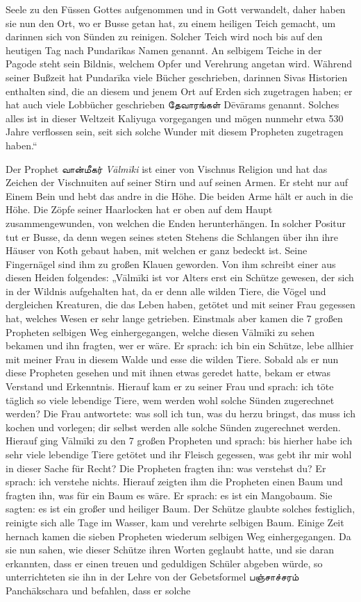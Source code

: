 \documentclass{article}
\newcommand{\TamilText}[1]{\texttamil{#1}}
\newcommand{\tam}[1]{\TamilText{#1}}
\begin{document}
Seele zu den Füssen Gottes aufgenommen und in Gott verwandelt, daher haben sie nun den Ort, wo er Busse getan hat, zu einem heiligen Teich gemacht, um darinnen sich von Sünden zu reinigen. Solcher Teich wird noch bis auf den heutigen Tag nach Pundar\={i}kas Namen genannt. An selbigem Teiche in der Pagode steht sein Bildnis, welchem Opfer und Verehrung angetan wird. Während seiner Bußzeit hat Pundar\={i}ka viele Bücher geschrieben, darinnen Sivas Historien enthalten sind, die an diesem und jenem Ort auf Erden sich zugetragen haben; er hat auch viele Lobbücher geschrieben \tam{தேவாரங்கள்} D\={e}v\={a}rams genannt. Solches alles ist in dieser Weltzeit Kaliyuga vorgegangen und mögen nunmehr etwa 530 Jahre verflossen sein, seit sich solche Wunder mit diesem Propheten zugetragen haben.“

Der Prophet \tam{வான்மீகர்} \emph{V\={a}lm\={i}ki} ist einer von Vischnus Religion und hat das Zeichen der Vischnuiten auf seiner Stirn und auf seinen Armen. Er steht nur auf Einem Bein und hebt das andre in die Höhe. Die beiden Arme hält er auch in die Höhe. Die Zöpfe seiner Haarlocken hat er oben auf dem Haupt zusammengewunden, von welchen die Enden herunterhängen. In solcher Positur tut er Busse, da denn wegen seines steten Stehens die Schlangen über ihn ihre Häuser von Koth gebaut haben, mit welchen er ganz bedeckt ist. Seine Fingernägel sind ihm zu großen Klauen geworden. Von ihm schreibt einer aus diesen Heiden folgendes: „V\={a}lm\={i}ki ist vor Alters erst ein Schütze gewesen, der sich in der Wildnis aufgehalten hat, da er denn alle wilden Tiere, die Vögel und dergleichen Kreaturen, die das Leben haben, getötet und mit seiner Frau gegessen hat, welches Wesen er sehr lange getrieben. Einstmals aber kamen die 7 großen Propheten selbigen Weg einhergegangen, welche diesen V\={a}lm\={i}ki zu sehen bekamen und ihn fragten, wer er wäre. Er sprach: ich bin ein Schütze, lebe allhier mit meiner Frau in diesem Walde und esse die wilden Tiere. Sobald als er nun diese Propheten gesehen und mit ihnen etwas geredet hatte, bekam er etwas Verstand und Erkenntnis. Hierauf kam er zu seiner Frau und sprach: ich töte täglich so viele lebendige Tiere, wem werden wohl solche Sünden zugerechnet werden? Die Frau antwortete: was soll ich tun, was du herzu bringst, das muss ich kochen und vorlegen; dir selbst werden alle solche Sünden zugerechnet werden. Hierauf ging V\={a}lm\={i}ki zu den 7 großen Propheten und sprach: bis hierher habe ich sehr viele lebendige Tiere getötet und ihr Fleisch gegessen, was gebt ihr mir wohl in dieser Sache für Recht? Die Propheten fragten ihn: was verstehst du? Er sprach: ich verstehe nichts. Hierauf zeigten ihm die Propheten einen Baum und fragten ihn, was für ein Baum es wäre. Er sprach: es ist ein Mangobaum. Sie sagten: es ist ein großer und heiliger Baum. Der Schütze glaubte solches festiglich, reinigte sich alle Tage im Wasser, kam und verehrte selbigen Baum. Einige Zeit hernach kamen die sieben Propheten wiederum selbigen Weg einhergegangen. Da sie nun sahen, wie dieser Schütze ihren Worten geglaubt hatte, und sie daran erkannten, dass er einen treuen und geduldigen Schüler abgeben würde, so unterrichteten sie ihn in der Lehre von der Gebetsformel \tam{பஞ்சாச்சரம்} Panch\={a}kschara und befahlen, dass er solche 
\end{document}
